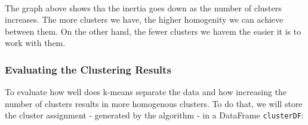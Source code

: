 \documentclass[11pt]{article}
\begin{document}
    \begin{center}
    \end{center}
    { \hspace*{\fill} \\}
    
    The graph above shows tha the inertia goes down as the number of
clusters increases. The more clusters we have, the higher homogenity we
can achieve between them. On the other hand, the fewer clusters we havem
the easier it is to work with them.

\subsubsection{Evaluating the Clustering
Results}\label{evaluating-the-clustering-results}

To evaluate how well does k-means separate the data and how increasing
the number of clusters results in more homogenous clusters. To do that,
we will store the cluster assignment - generated by the algorithm - in a
DataFrame \texttt{clusterDF}:
\end{document}
